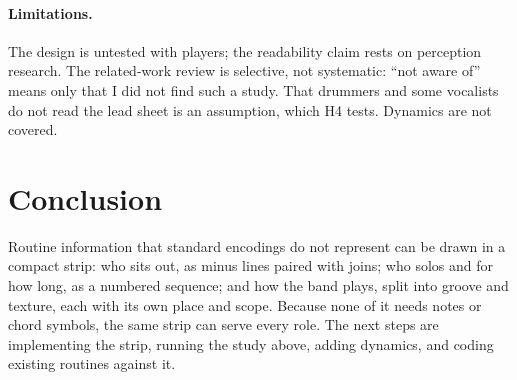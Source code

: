 \documentclass[10pt,twocolumn,a4paper]{article}
\begin{document}
\paragraph{Limitations.} The design is untested with players; the readability claim
rests on perception research. The related-work review is selective, not systematic:
``not aware of'' means only that I did not find such a study. That drummers and some
vocalists do not read the lead sheet is an assumption, which H4 tests. Dynamics are not
covered.

\section{Conclusion}

Routine information that standard encodings do not represent can be drawn in a compact
strip: who sits out, as minus lines paired with joins; who solos and for how long, as a
numbered sequence; and how the band plays, split into groove and texture,
each with its own place and scope. Because none of it needs notes or chord symbols, the
same strip can serve every role. The next steps are implementing the strip, running the
study above, adding dynamics, and coding existing routines against it.
\end{document}

